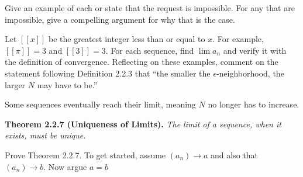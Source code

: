 \begin{exercise}
  Give an example of each or state that the request is impossible. For any that are impossible, give a compelling argument for why that is the case.
\end{exercise}

\begin{solution}
\end{solution}

\begin{exercise}
  Let $[[x]]$ be the greatest integer less than or equal to $x$. For example, $[[\pi]]=3$ and $[[3]]=3$. For each sequence, find $\lim a_{n}$ and verify it with the definition of convergence.
  Reflecting on these examples, comment on the statement following Definition 2.2.3 that ``the smaller the $\epsilon$-neighborhood, the larger $N$ may have to be.''
\end{exercise}

\begin{solution}
  Some sequences eventually reach their limit, meaning $N$ no longer has to increase.
\end{solution}

\begin{exercise}
  \textbf{Theorem 2.2.7 (Uniqueness of Limits).} \textit{The limit of a sequence, when it exists, must be unique.}

  Prove Theorem 2.2.7. To get started, assume $\left(a_{n}\right) \rightarrow a$ and also that $\left(a_{n}\right) \rightarrow b$. Now argue $a=b$
\end{exercise}

